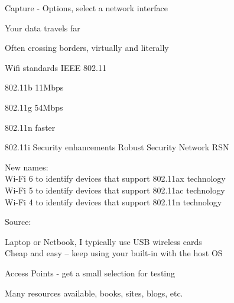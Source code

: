\documentclass[Screen16to9,17pt]{foils}
\begin{document}




\centerline{Capture - Options, select a network interface}
\centerline{}




\begin{list2}
\item Your data travels far
\item Often crossing borders, virtually and literally
\end{list2}








\begin{list1}
\item Wifi standards IEEE 802.11
\begin{list2}
\item 802.11b 11Mbps
\item 802.11g 54Mbps
\item 802.11n faster
\item 802.11i Security enhancements Robust Security Network RSN
\end{list2}
\item New names:\\
Wi-Fi 6 to identify devices that support 802.11ax technology\\
Wi-Fi 5 to identify devices that support 802.11ac technology\\
Wi-Fi 4 to identify devices that support 802.11n technology
\end{list1}

Source: 






\begin{list1}
\item Laptop or Netbook, I typically use USB wireless cards\\
Cheap and easy -- keep using your built-in with the host OS
\item Access Points - get a small selection for testing
\item Many resources available, books, sites, blogs, etc.
\end{list1}
\end{document}
